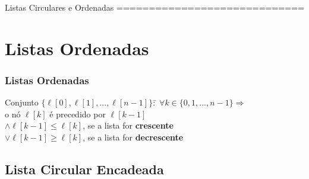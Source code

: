 
Listas Circulares e Ordenadas
=============================

\def\sequentialqueuehead{
  
}


\frame{\maketitle}

\section{Listas Ordenadas}

\begin{frame}
\frametitle{Listas Ordenadas}
\small

\begin{definition}
\begin{tabbing}
Conjunto $\{\ell[0], \ell[1],...,\ell[n-1]\} :$\= $\forall k \in
\{0, 1,..., n-1\} \Rightarrow$\\
 \> o nó $\ell[k]$ é precedido por $\ell[k-1]$\\
 \> $\land \ell[k-1] \leq \ell[k]$, se a lista for {\bf crescente}\\
 \> $\lor \ell[k-1] \geq \ell[k]$, se a lista for {\bf decrescente}\\
\end{tabbing}
\end{definition}

\end{frame}


\subsection{Lista Circular Encadeada}

